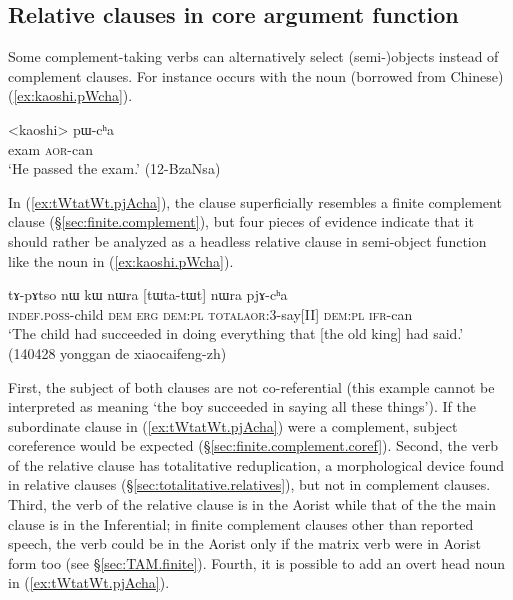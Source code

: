 \subsection{Relative clauses in core argument function}   \label{sec:relative.core.arg}
Some com\-ple\-ment-taking verbs can alternatively select (semi-)objects instead of complement clauses. For instance  occurs with the noun  (borrowed from Chinese) (\ref{ex:kaoshi.pWcha}).

\begin{exe}
	\ex \label{ex:kaoshi.pWcha}
	\gll   <kaoshi> pɯ-cʰa  \\
	exam \textsc{aor}-can \\
	\glt `He passed the exam.' (12-BzaNsa)
\end{exe}

In (\ref{ex:tWtatWt.pjAcha}), the clause  superficially resembles a finite complement clause (§\ref{sec:finite.complement}), but four pieces of evidence indicate that it should rather be analyzed as a headless relative clause in semi-object function like the noun  in (\ref{ex:kaoshi.pWcha}).

\begin{exe}
	\ex \label{ex:tWtatWt.pjAcha}
	\gll  tɤ-pɤtso nɯ kɯ nɯra [tɯ\redp{}ta-tɯt] nɯra pjɤ-cʰa \\
	\textsc{indef}.\textsc{poss}-child \textsc{dem} \textsc{erg} \textsc{dem}:\textsc{pl} \textsc{total}\redp{}\textsc{aor}:3\flobv{}-say[II] \textsc{dem}:\textsc{pl} \textsc{ifr}-can \\
	\glt `The child had succeeded in doing everything that [the old king] had said.' (140428 yonggan de xiaocaifeng-zh)
\end{exe}

First, the subject of both clauses are not co-referential (this example cannot be interpreted as meaning `the boy succeeded in saying all these things'). If the subordinate clause in (\ref{ex:tWtatWt.pjAcha}) were a complement, subject coreference would be expected (§\ref{sec:finite.complement.coref}). Second, the verb of the relative clause has totalitative reduplication, a morphological device  found in relative clauses (§\ref{sec:totalitative.relatives}), but not in complement clauses. Third, the verb of the relative clause is in the Aorist while that of the the main clause is in the Inferential; in finite complement clauses other than reported speech, the verb could be in the Aorist only if the matrix verb were in Aorist form too (see §\ref{sec:TAM.finite}). Fourth, it is possible to add an overt head noun in (\ref{ex:tWtatWt.pjAcha}).


